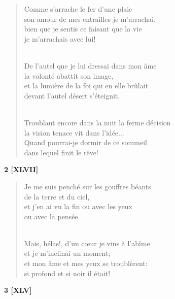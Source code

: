 \documentclass[a4paper,12pt]{book}
\begin{document}

\begin{verse}
Comme s'arrache le fer d'une plaie \\
son amour de mes entrailles je m'arrachai, \\
bien que je sentis ce faisant que la vie \\
je m'arrachais avec lui! \\ \

De l'autel que je lui dressai dans mon âme \\
la volonté abattit son image, \\
et la lumière de la foi qui en elle brûlait \\
devant l'autel désert s'éteignit. \\ \

Troublant encore dans la nuit la ferme décision \\
la vision tenace vit dans l'idée... \\
Quand pourrai-je dormir de ce sommeil \\
dans lequel finit le rêve! \\
\end{verse}

\bigskip

\begin{center} {\bf 2 [XLVII]} \end{center}

\begin{verse}
Je me suis penché sur les gouffres béants\\
de la terre et du ciel, \\
et j'en ai vu la fin ou avec les yeux \\
ou avec la pensée. \\ \

Mais, hélas!, d'un c{\oe}ur je vins à l'abîme \\
et je m'inclinai un moment; \\
et mon âme et mes yeux se troublèrent: \\
si profond et si noir il était! \\
\end{verse}

\bigskip

\begin{center} {\bf 3 [XLV]} \end{center}
\end{document}
